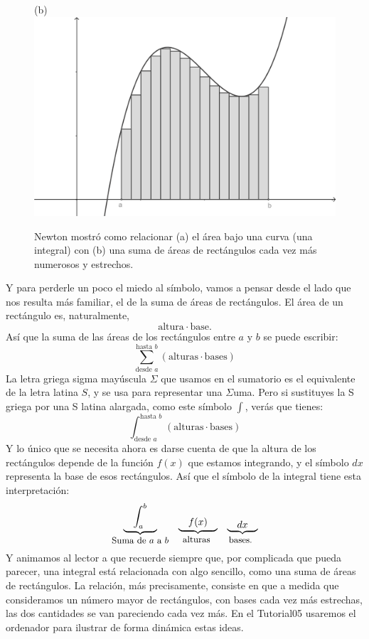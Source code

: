 \begin{figure}[hp]
\begin{center}
\begin{bn}
(b)\\
\includegraphics[width=12cm]{../fig/Cap05-IntegralRectangulosSumaInferior-a-bn.png}
\end{bn}
\caption{Newton mostró como relacionar (a) el área bajo una curva (una integral) con (b) una suma de áreas de rectángulos cada vez más numerosos y estrechos.}
\label{cap05:fig:IntegralRectangulosSumaInferior}
\end{center}
\end{figure}
Y para perderle un poco el miedo al símbolo, vamos a pensar desde el lado que nos resulta más familiar, el de la suma de áreas de rectángulos. El área de un rectángulo es, naturalmente,
\[\mbox{altura}\cdot\mbox{base}.\]
Así que la suma de las áreas de los rectángulos entre $a$ y $b$ se puede escribir:
\[\sum_{\mbox{desde $a$}}^{\mbox{hasta $b$}}\left(\mbox{alturas}\cdot\mbox{bases}\right)\]
La letra griega sigma mayúscula $\displaystyle\Sigma$ que usamos en el sumatorio es el equivalente de la letra latina $S$, y se usa para representar una $\Sigma$uma. Pero si sustituyes la S griega por una S latina alargada, como este símbolo $\displaystyle\int$, verás que tienes:
\[\int_{\mbox{desde $a$}}^{\mbox{hasta $b$}}\left(\mbox{alturas}\cdot\mbox{bases}\right)\]
Y lo único que se necesita ahora es darse cuenta de que la altura de los rectángulos depende de la función $f(x)$ que estamos integrando, y el símbolo $dx$ representa la  base de esos rectángulos. Así que el símbolo de la integral tiene esta interpretación:
\[
\begin{array}{ccc}
\underbrace{\quad\int_a^b\quad}_{\mbox{\small Suma de $a$ a $b$}}&
\raisebox{-2mm}{$\underbrace{\vspace{2mm}\quad f(x)\quad}_{\mbox{\small alturas }}$}&
\raisebox{-3mm}{$\underbrace{\vspace{2mm}\quad dx\quad}_{\mbox{\small bases. }}$}
\end{array}
\]
Y animamos al lector a que recuerde siempre que, por complicada que pueda parecer, una integral está relacionada con algo sencillo, como una suma de áreas de rectángulos. La relación, más precisamente, consiste en que a medida que consideramos un número mayor de rectángulos, con bases cada vez más estrechas, las dos cantidades se van pareciendo cada vez más. En el Tutorial05 usaremos el ordenador para ilustrar de forma dinámica estas ideas.

